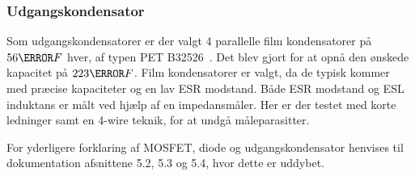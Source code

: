 \subsubsection{Udgangskondensator}
\noindent Som udgangskondensatorer er der valgt 4 parallelle film kondensatorer på $56\micro F$ hver, af typen PET B32526~\cite{Kondensator}. Det blev gjort for at opnå den ønskede kapacitet på $223\micro F$. Film kondensatorer er valgt, da de typisk kommer med præcise kapaciteter og en lav ESR modstand. Både ESR modstand og ESL induktans er målt ved hjælp af en impedansmåler. Her er der testet med korte ledninger samt en 4-wire teknik, for at undgå måleparasitter.

For yderligere forklaring af MOSFET, diode og udgangskondensator henvises til dokumentation afsnittene 5.2, 5.3 og 5.4, hvor dette er uddybet.